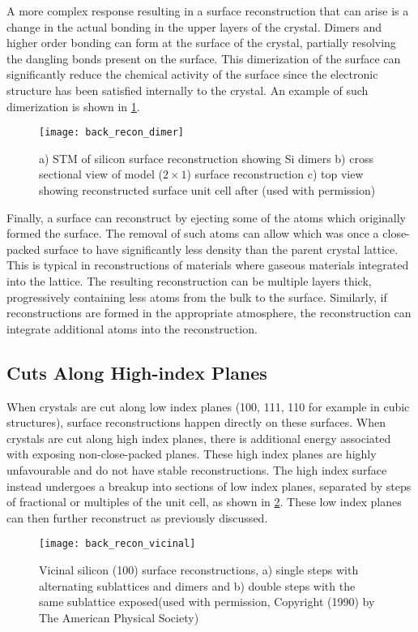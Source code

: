 A more complex response resulting in a surface reconstruction that can arise is a change in the actual bonding in the upper layers of the crystal. Dimers and higher order bonding can form at the surface of the crystal, partially resolving the dangling bonds present on the surface. This dimerization of the surface can significantly reduce the chemical activity of the surface since the electronic structure has been satisfied internally to the crystal\cite{Duke1996}. An example of such dimerization is shown in \cref{fig:back_recon_dimer}.
\begin{figure}
    \centering
    \texttt{[image: back\_recon\_dimer]}
    \caption[Silicon dimer surface reconstruction]{\label{fig:back_recon_dimer}a) STM of silicon surface reconstruction showing Si dimers b) cross sectional view of model ($2 \times 1$) surface reconstruction c) top view showing reconstructed surface unit cell after \cite{Zhang1997,Lagally1993}(used with permission)}
\end{figure}

Finally, a surface can reconstruct by ejecting some of the atoms which originally formed the surface. The removal of such atoms can allow which was once a close-packed surface to have significantly less density than the parent crystal lattice. This is typical in reconstructions of materials where gaseous materials integrated into the lattice. The resulting reconstruction can be multiple layers thick, progressively containing less atoms from the bulk to the surface. Similarly, if reconstructions are formed in the appropriate atmosphere, the reconstruction can integrate additional atoms into the reconstruction.

\subsection{Cuts Along High-index Planes}
When crystals are cut along low index planes (100, 111, 110 for example in cubic structures), surface reconstructions happen directly on these surfaces. When crystals are cut along high index planes, there is additional energy associated with exposing non-close-packed planes. These high index planes are highly unfavourable and do not have stable reconstructions. The high index surface instead undergoes a breakup into sections of low index planes, separated by steps of fractional or multiples of the unit cell, as shown in \cref{fig:back_recon_vicinal}. These low index planes can then further reconstruct as previously discussed.
\begin{figure}
    \centering
    \texttt{[image: back\_recon\_vicinal]}
    \caption[Silicon single and double step surface reconstructions]{\label{fig:back_recon_vicinal}Vicinal silicon (100) surface reconstructions, a) single steps with alternating sublattices and dimers and b) double steps with the same sublattice exposed\cite{Alerhand1990}(used with permission, Copyright (1990) by The American Physical Society)}
\end{figure}

